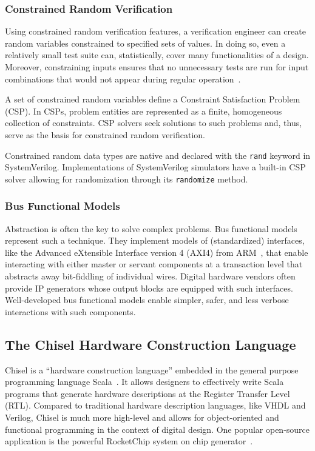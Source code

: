 \documentclass[conference]{IEEEtran}
\begin{document}
\subsubsection{Constrained Random Verification}
Using constrained random verification features, a verification engineer can create random variables constrained to 
specified sets of values. In doing so, even a relatively small test suite can, statistically, 
cover many functionalities of a design. Moreover, constraining inputs ensures that no 
unnecessary tests are run for input combinations that would not appear during regular 
operation~\cite{MehtaCRV2018}.

A set of constrained random variables define a Constraint Satisfaction Problem (CSP). In CSPs, 
problem entities are represented as a finite, homogeneous collection of constraints. CSP solvers 
seek solutions to such problems and, thus, serve as the basis for constrained random verification.

Constrained random data types are native and declared with the \texttt{rand} keyword in SystemVerilog. 
Implementations of SystemVerilog simulators have a built-in CSP solver allowing for randomization through its \texttt{randomize} method.

\subsubsection{Bus Functional Models}
Abstraction is often the key to solve complex problems. Bus functional models represent such 
a technique. They implement models of (standardized) interfaces, like the Advanced eXtensible Interface version 4 (AXI4) from ARM~\cite{axi4standard}, that enable 
interacting with either master or servant components at a transaction level that abstracts away 
bit-fiddling of individual wires. Digital hardware vendors often provide IP generators whose output 
blocks are equipped with such interfaces. Well-developed bus functional models enable simpler, safer, and less 
verbose interactions with such components.

\subsection{The Chisel Hardware Construction Language}\label{subsec:chisel}

Chisel is a ``hardware construction language'' embedded in the general purpose programming language Scala~\cite{bachrach2012chisel, chisel:book}.
It allows designers to effectively write Scala programs that generate hardware descriptions at the Register Transfer Level (RTL).
Compared to traditional hardware description languages, like 
VHDL and Verilog, Chisel is much more high-level and allows for object-oriented and functional 
programming in the context of digital design.
One popular open-source application is the powerful RocketChip system on chip generator~\cite{rocketchip}.
\end{document}
